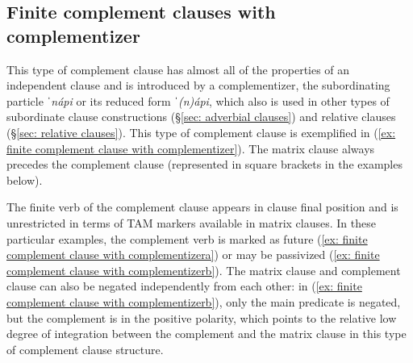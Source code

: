 \subsection{Finite complement clauses with complementizer}
\label{subsec: finite complement clauses with complementizer}

This type of complement clause has almost all of the properties of an independent clause and is introduced by a complementizer, the subordinating particle \textit{ˈnápi} or its reduced form \textit{ˈ(n)ápi}, which also is used in other types of subordinate clause constructions (§\ref{sec: adverbial clauses}) and relative clauses (§\ref{sec: relative clauses}). This type of complement clause is exemplified in (\ref{ex: finite complement clause with complementizer}). The matrix clause always precedes the complement clause (represented in square brackets in the examples below).

\newpage
\ea\label{ex: finite complement clause with complementizer}

    \label{ex: finite complement clause with complementizera}
        \label{ex: finite complement clause with complementizerb}
    \z
\z

The finite verb of the complement clause appears in clause final position and is unrestricted in terms of TAM markers available in matrix clauses. In these particular examples, the complement verb is marked as future (\ref{ex: finite complement clause with complementizera}) or may be passivized (\ref{ex: finite complement clause with complementizerb}). The matrix clause and complement clause can also be negated independently from each other: in (\ref{ex: finite complement clause with complementizerb}), only the main predicate is negated, but the complement is in the positive polarity, which points to the relative low degree of integration between the complement and the matrix clause in this type of complement clause structure.

